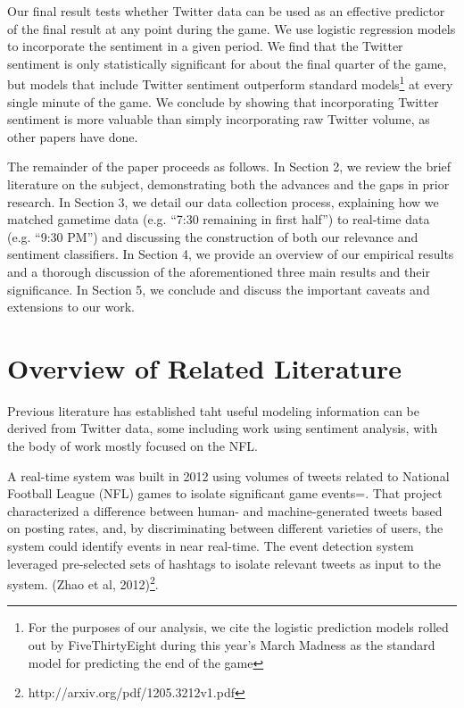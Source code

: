 \documentclass[12pt]{article}
\begin{document}
\begin{doublespacing}
Our final result tests whether Twitter data can be used as an effective predictor of the final result at any point during the game. We use logistic regression models to incorporate the sentiment in a given period. We find that the Twitter sentiment is only statistically significant for about the final quarter of the game, but models that include Twitter sentiment outperform standard models\footnote{For the purposes of our analysis, we cite the logistic prediction models rolled out by FiveThirtyEight during this year's March Madness as the standard model for predicting the end of the game} at every single minute of the game. We conclude by showing that incorporating Twitter sentiment is more valuable than simply incorporating raw Twitter volume, as other papers have done. 

The remainder of the paper proceeds as follows. In Section 2, we review the brief literature on the subject, demonstrating both the advances and the gaps in prior research. In Section 3, we detail our data collection process, explaining how we matched gametime data (e.g. ``7:30 remaining in first half'') to real-time data (e.g. ``9:30 PM'') and discussing the construction of both our relevance and sentiment classifiers. In Section 4, we provide an overview of our empirical results and a thorough discussion of the aforementioned three main results and their significance. In Section 5, we conclude and discuss the important caveats and extensions to our work. 

\section{Overview of Related Literature}

Previous literature has established taht useful modeling information can be
derived from Twitter data, some including work using sentiment analysis, with the body of work mostly focused on the NFL. 

A real-time system was built in 2012 using volumes of 
tweets related to National Football League (NFL) games to 
isolate significant game
events=. That project characterized a 
difference between human- and machine-generated tweets
based on posting rates, and, by discriminating between 
different varieties of users, the system could 
identify events in near real-time. The event detection
system leveraged pre-selected sets of hashtags
to isolate relevant tweets as input to the system. (Zhao et al, 
2012)\footnote{http://arxiv.org/pdf/1205.3212v1.pdf}. 


\end{doublespacing}
\end{document}
